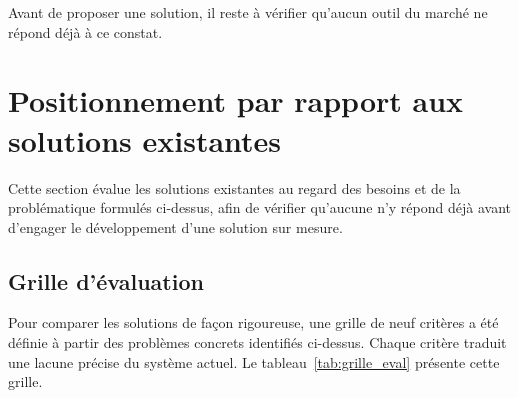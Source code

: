 Avant de proposer une solution, il reste à vérifier qu'aucun outil du marché ne répond déjà à ce constat.

\section{Positionnement par rapport aux solutions existantes}

Cette section évalue les solutions existantes au regard des besoins et de la problématique formulés ci-dessus, afin de vérifier qu'aucune n'y répond déjà avant d'engager le développement d'une solution sur mesure.

\subsection{Grille d'évaluation}

Pour comparer les solutions de façon rigoureuse, une grille de neuf critères a été définie
à partir des problèmes concrets identifiés ci-dessus. Chaque critère traduit une
lacune précise du système actuel. Le tableau~\ref{tab:grille_eval} présente cette grille.

